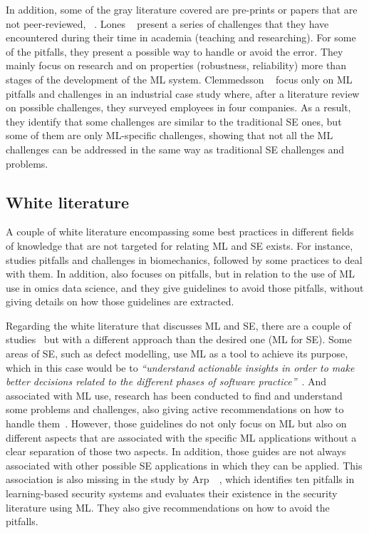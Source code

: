 In addition, some of the gray literature covered are pre-prints or papers that are not peer-reviewed, \eg~\cite{MichaelLones2021, Clemmedsson2018}. Lones \etal~\cite{MichaelLones2021} present a series of challenges that they have encountered during their time in academia (\ie teaching and researching). For some of the pitfalls, they present a possible way to handle or avoid the error.  They mainly focus on research and on properties (\ie robustness, reliability) more than stages of the development of the ML system.  Clemmedsson \etal~\cite{Clemmedsson2018}  focus only on ML pitfalls and challenges in an industrial case study where, after a literature review on possible challenges, they surveyed employees in four companies. As a result, they  identify that some challenges are similar to the traditional SE ones, but some of them are only ML-specific challenges, showing that not all the ML challenges can be addressed in the same way as traditional SE challenges and problems. 


\subsection{White literature}

A couple of white literature encompassing some best practices in different fields of knowledge that are not targeted for relating ML and SE exists. For instance, \cite{halilaj2018machine} studies pitfalls and challenges in  biomechanics, followed by some practices to deal with them.  In addition, \cite{teschendorff2019avoiding} also focuses  on pitfalls, but in relation to the use of  ML use in omics data science, and they give guidelines to avoid those pitfalls, without giving details  on how those guidelines are extracted. 

Regarding the white literature that discusses ML and SE, there are a couple of studies~\cite{tantithamthavorn2018experience, breck2017ml, amershi2019software, serban2020adoption,ArpQuiPen_22} but with a different approach than the desired one (\ie ML for SE). Some areas of SE, such as defect modelling, use ML as a tool to achieve its purpose, which in this case would be to \textit{``understand actionable insights in order to make better decisions related to the different phases of software practice''}~\cite{tantithamthavorn2018experience}. And associated with ML use, research has been conducted to find and understand some problems and challenges, also giving active recommendations on how to handle them~\cite{tantithamthavorn2018experience}. However, those guidelines do not only focus on ML but also on different aspects that are associated with the specific ML applications without a clear separation of those two aspects. 
In addition,  those guides are not always associated with other possible SE applications in which they can be applied. This  association is also missing in the study by Arp~\etal~\cite{ArpQuiPen_22}, which identifies ten pitfalls in learning-based security systems and  evaluates their existence in the security literature using ML. They also give recommendations on how to avoid the pitfalls.

